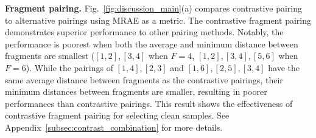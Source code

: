 \documentclass{article}
\theoremstyle{plain}
\theoremstyle{definition}
\theoremstyle{remark}
\begin{document}



\textbf{Fragment pairing.}
Fig.~\ref{fig:discussion_main}(a) compares contrastive pairing to alternative pairings 
using MRAE as a metric. %
The contrastive fragment pairing demonstrates superior performance to other pairing methods.
Notably, the performance is poorest when both the average and minimum distance between fragments are smallest ($[1,2], [3,4]$ when $F=4$, $[1,2],[3,4],[5,6]$ when $F=6$).
While the pairings of $[1,4], [2,3]$ and $[1,6],[2,5],[3,4]$ have the same average distance between fragments as the contrastive pairings, their minimum distances between fragments are smaller, resulting in poorer performances than contrastive pairings.
This result shows the effectiveness of contrastive fragment pairing for selecting clean samples.
See Appendix~\ref{subsec:contrast_combination} for more details. %
\end{document}
